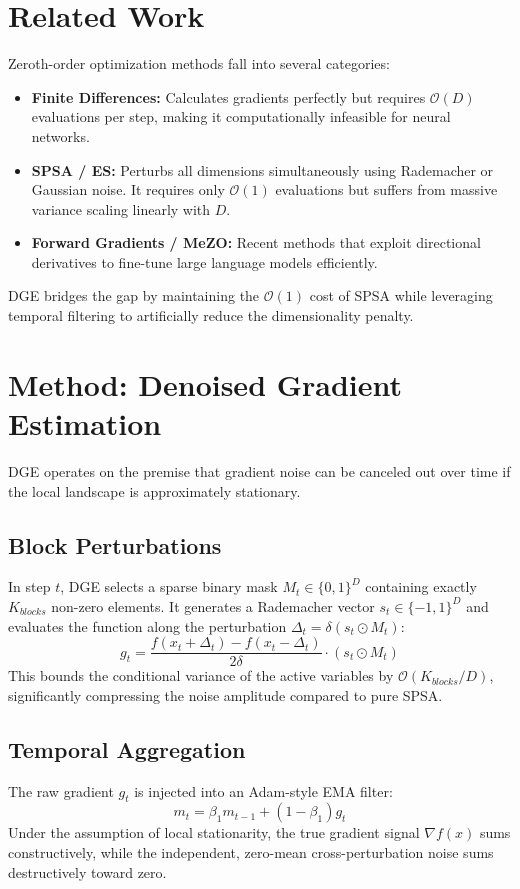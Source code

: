 \documentclass[11pt, a4paper]{article}
\begin{document}
\section{Related Work}
Zeroth-order optimization methods fall into several categories:
\begin{itemize}
    \item \textbf{Finite Differences:} Calculates gradients perfectly but requires $\mathcal{O}(D)$ evaluations per step, making it computationally infeasible for neural networks.
    \item \textbf{SPSA / ES:} Perturbs all dimensions simultaneously using Rademacher or Gaussian noise. It requires only $\mathcal{O}(1)$ evaluations but suffers from massive variance scaling linearly with $D$.
    \item \textbf{Forward Gradients / MeZO:} Recent methods that exploit directional derivatives to fine-tune large language models efficiently.
\end{itemize}
DGE bridges the gap by maintaining the $\mathcal{O}(1)$ cost of SPSA while leveraging temporal filtering to artificially reduce the dimensionality penalty.

\section{Method: Denoised Gradient Estimation}
DGE operates on the premise that gradient noise can be canceled out over time if the local landscape is approximately stationary.

\subsection{Block Perturbations}
In step $t$, DGE selects a sparse binary mask $M_t \in \{0, 1\}^D$ containing exactly $K_{blocks}$ non-zero elements. It generates a Rademacher vector $s_t \in \{-1, 1\}^D$ and evaluates the function along the perturbation $\Delta_t = \delta (s_t \odot M_t)$:
\begin{equation}
    g_t = \frac{f(x_t + \Delta_t) - f(x_t - \Delta_t)}{2\delta} \cdot (s_t \odot M_t)
\end{equation}
This bounds the conditional variance of the active variables by $\mathcal{O}(K_{blocks}/D)$, significantly compressing the noise amplitude compared to pure SPSA.

\subsection{Temporal Aggregation}
The raw gradient $g_t$ is injected into an Adam-style EMA filter:
\begin{equation}
    m_t = \beta_1 m_{t-1} + (1 - \beta_1) g_t
\end{equation}
Under the assumption of local stationarity, the true gradient signal $\nabla f(x)$ sums constructively, while the independent, zero-mean cross-perturbation noise sums destructively toward zero.
\end{document}
